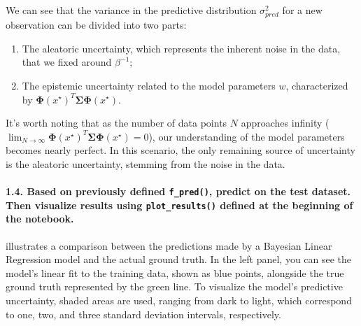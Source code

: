 We can see that the variance in the predictive distribution $ \sigma ^2_{pred} $  for a new observation can be divided into two parts:
\begin{enumerate}
    \item The aleatoric uncertainty, which represents the inherent noise in the data, that we fixed around $ \beta ^{-1}$;
    \item The epistemic uncertainty related to the model parameters $ w $, characterized by $\boldsymbol{\Phi}(x^\star)^T \boldsymbol{\Sigma} \boldsymbol{\Phi}(x^\star).$
\end{enumerate}
It's worth noting that as the number of data points $N$ approaches infinity ($ \lim_{N \to \infty} \boldsymbol{\Phi}(x^\star)^T \boldsymbol{\Sigma} \boldsymbol{\Phi}(x^\star) = 0 $), our understanding of the model parameters becomes nearly perfect. In this scenario, the only remaining source of uncertainty is the aleatoric uncertainty, stemming from the noise in the data.

\paragraph*{1.4. Based on previously defined \texttt{f\_pred()}, predict on the test dataset. Then visualize results using \texttt{plot\_results()} defined at the beginning of the notebook.}
 illustrates a comparison between the predictions made by a Bayesian Linear Regression model and the actual ground truth. In the left panel, you can see the model's linear fit to the training data, shown as blue points, alongside the true ground truth represented by the green line. To visualize the model's predictive uncertainty, shaded areas are used, ranging from dark to light, which correspond to one, two, and three standard deviation intervals, respectively.

